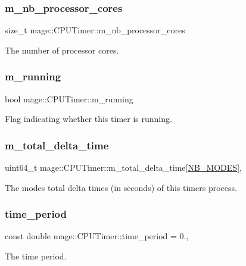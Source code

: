 \subsubsection{\texorpdfstring{m\+\_\+nb\+\_\+processor\+\_\+cores}{m\_nb\_processor\_cores}}
{\footnotesize\ttfamily size\+\_\+t mage\+::\+C\+P\+U\+Timer\+::m\+\_\+nb\+\_\+processor\+\_\+cores\hspace{0.3cm}{\ttfamily [private]}}

The number of processor cores. \hypertarget{classmage_1_1_c_p_u_timer_a7190afa453085b7bbd7cb76ff6bb62f2}{}\label{classmage_1_1_c_p_u_timer_a7190afa453085b7bbd7cb76ff6bb62f2} 
\subsubsection{\texorpdfstring{m\+\_\+running}{m\_running}}
{\footnotesize\ttfamily bool mage\+::\+C\+P\+U\+Timer\+::m\+\_\+running\hspace{0.3cm}{\ttfamily [private]}}

Flag indicating whether this timer is running. \hypertarget{classmage_1_1_c_p_u_timer_aa4b96eea0eb0cc3e5d5a4bb7a343a4f6}{}\label{classmage_1_1_c_p_u_timer_aa4b96eea0eb0cc3e5d5a4bb7a343a4f6} 
\subsubsection{\texorpdfstring{m\+\_\+total\+\_\+delta\+\_\+time}{m\_total\_delta\_time}}
{\footnotesize\ttfamily uint64\+\_\+t mage\+::\+C\+P\+U\+Timer\+::m\+\_\+total\+\_\+delta\+\_\+time\mbox{[}\hyperlink{classmage_1_1_c_p_u_timer_a17f6aa71c97aef46fea51190709e4c14ab63e6023ec0bea89568ebb2b98728b77}{N\+B\+\_\+\+M\+O\+D\+ES}\mbox{]}\hspace{0.3cm}{\ttfamily [mutable]}, {\ttfamily [private]}}

The modes\textquotesingle{} total delta times (in seconds) of this timer\textquotesingle{}s process. \hypertarget{classmage_1_1_c_p_u_timer_a9ff7683150a07f2040b660fc3775337b}{}\label{classmage_1_1_c_p_u_timer_a9ff7683150a07f2040b660fc3775337b} 
\subsubsection{\texorpdfstring{time\+\_\+period}{time\_period}}
{\footnotesize\ttfamily const double mage\+::\+C\+P\+U\+Timer\+::time\+\_\+period = 0.\hspace{0.3cm}{\ttfamily [static]}, {\ttfamily [private]}}

The time period. 
